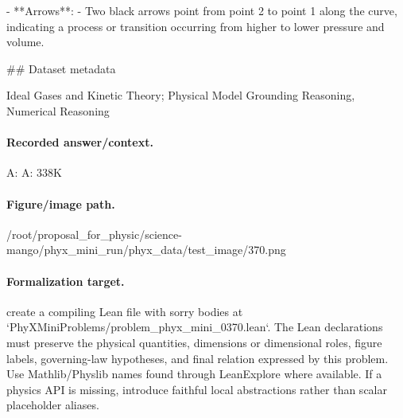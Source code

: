 - **Arrows**:
  - Two black arrows point from point 2 to point 1 along the curve, indicating a process or transition occurring from higher to lower pressure and volume.

\#\# Dataset metadata

Ideal Gases and Kinetic Theory; Physical Model Grounding Reasoning, Numerical Reasoning

\paragraph{Recorded answer/context.}
A: A: 338K

\paragraph{Figure/image path.}
/root/proposal\_for\_physic/science-mango/phyx\_mini\_run/phyx\_data/test\_image/370.png

\paragraph{Formalization target.}
create a compiling Lean file with sorry bodies at `PhyXMiniProblems/problem\_phyx\_mini\_0370.lean`. The Lean declarations must preserve the physical quantities, dimensions or dimensional roles, figure labels, governing-law hypotheses, and final relation expressed by this problem.
Use Mathlib/Physlib names found through LeanExplore where available. If a physics API is missing, introduce faithful local abstractions rather than scalar placeholder aliases.

